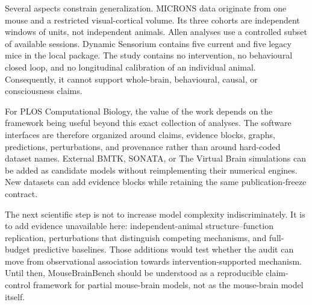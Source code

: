 Several aspects constrain generalization. MICRONS data originate from one mouse
and a restricted visual-cortical volume. Its three cohorts are independent
windows of units, not independent animals. Allen analyses use a controlled
subset of available sessions. Dynamic Sensorium contains five current and five
legacy mice in the local package. The study contains no intervention, no
behavioural closed loop, and no longitudinal calibration of an individual
animal. Consequently, it cannot support whole-brain, behavioural, causal, or
consciousness claims.

For PLOS Computational Biology, the value of the work depends on the framework
being useful beyond this exact collection of analyses. The software interfaces
are therefore organized around claims, evidence blocks, graphs, predictions,
perturbations, and provenance rather than around hard-coded dataset names.
External BMTK, SONATA, or The Virtual Brain simulations can be added as candidate
models without reimplementing their numerical engines. New datasets can add
evidence blocks while retaining the same publication-freeze contract.

The next scientific step is not to increase model complexity indiscriminately.
It is to add evidence unavailable here: independent-animal structure--function
replication, perturbations that distinguish competing mechanisms, and
full-budget predictive baselines. Those additions would test whether the audit
can move from observational association towards intervention-supported
mechanism. Until then, MouseBrainBench should be understood as a reproducible
claim-control framework for partial mouse-brain models, not as the mouse-brain
model itself.
